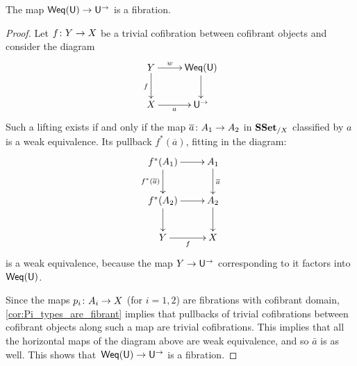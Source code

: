 \documentclass[reqno,10pt,a4paper,oneside,draft]{amsart}
\begin{document}






\begin{lemma} \label{thm:lemma-for-u} The map $\mathsf{Weq}(\mathsf{U}) \rightarrow \mathsf{U}^\to$ is a fibration.
\end{lemma}


\begin{proof}  Let $f \colon Y \to X$ be a trivial cofibration between cofibrant objects and consider the diagram
\[ 
\xymatrix{ 
Y \ar[d]_f \ar[r]^-{w} & \mathsf{Weq}(\U) \ar[d] \\
X \ar[r]_-{a} & \U^{\rightarrow} }
\]
Such a lifting exists if and only if the map $\overline{a} \colon A_1 \to A_2$ in $\mathbf{SSet}_{/X}$ classified by $a$ is a weak equivalence. Its pullback $f^*(\overline{a})$, fitting in the diagram:
\[ 
\xymatrix{ 
f^*(A_1) \ar[d]_{f^*(\overline{a})}  \ar[r]  & A_1 \ar[d]^{\overline{a}} \\
f^*(A_2) \ar[r] \ar[d]   & A_2 \ar[d] \\
Y \ar[r]_f & X }
\]
is a weak equivalence, because the map $Y \rightarrow \mathsf{U}^{\to}$ corresponding to it factors into $\mathsf{Weq}(\mathsf{U})$.

Since the maps $p_i \colon A_i \rightarrow X$ (for $i = 1, 2$) are fibrations with cofibrant domain, \cref{cor:Pi_types_are_fibrant} implies that pullbacks of trivial cofibrations between cofibrant objects along such 
a map are trivial cofibrations. This implies that all the horizontal maps of the diagram above are weak equivalence, and so 
$\bar{a}$ is as well. This shows that~$\mathsf{Weq}(\mathsf{U}) \rightarrow \mathsf{U}^{\rightarrow}$ is a fibration.
\end{proof}
\end{document}

